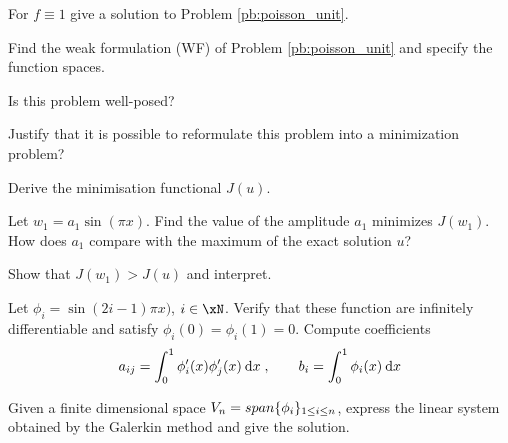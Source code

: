 \begin{tmasltn}{2.2}
\begin{tmatsks}
\item For $f \equiv 1$ give a solution to Problem \eqref{pb:poisson_unit}.
\item Find the weak formulation (WF) of Problem \eqref{pb:poisson_unit} and specify the function spaces.
\item Is this problem well-posed?
\item Justify that it is possible to reformulate this problem into a minimization problem?
\item Derive the minimisation functional $J(u)$.
\item Let $w_1 = a_1 \sin(\pi x)$. Find the value of the amplitude $a_1$ minimizes $J(w_1)$. How does $a_1$ compare with the maximum of the exact solution $u$?
\item Show that $J(w_1) > J(u)$ and interpret.
\item Let $\phi_i = \sin(2 i - 1) \pi x)$, $i\in\xN$. Verify that these function are infinitely differentiable and satisfy $\phi_i(0)= \phi_i(1)=0$. Compute coefficients
\begin{equation*}
a_{ij} = \int_0^1 \phi_i'(x) \phi_j'(x) \hspace{.5ex}{\mathrm d} x\;, \qquad b_i = \int_0^1 \phi_i(x) \hspace{.5ex}{\mathrm d} x
\end{equation*}
\item Given a finite dimensional space ${V}_n = span \lbrace \phi_i \rbrace_{1\leq i \leq n}$, express the linear system obtained by the Galerkin method and give the solution.
\end{tmatsks}
\end{tmasltn}


